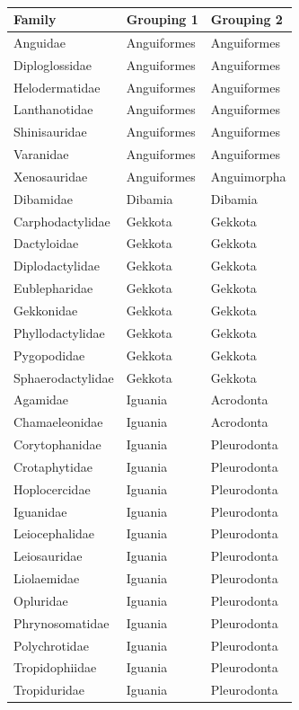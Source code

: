 \documentclass[a4paper, 12pt]{article}
\begin{document}
\begin{longtable}{lll}
\caption{} 

\hline
\textbf{Family} & \textbf{Grouping 1} & \textbf{Grouping 2}\\ 
\hline
Anguidae & Anguiformes & Anguiformes \\
Diploglossidae & Anguiformes & Anguiformes \\
Helodermatidae & Anguiformes & Anguiformes \\
Lanthanotidae & Anguiformes & Anguiformes \\
Shinisauridae & Anguiformes & Anguiformes \\
Varanidae & Anguiformes & Anguiformes \\
Xenosauridae & Anguiformes & Anguimorpha \\
Dibamidae & Dibamia & Dibamia \\
Carphodactylidae & Gekkota & Gekkota \\
Dactyloidae & Gekkota & Gekkota \\
Diplodactylidae & Gekkota & Gekkota \\
Eublepharidae & Gekkota & Gekkota \\
Gekkonidae & Gekkota & Gekkota \\
Phyllodactylidae & Gekkota & Gekkota \\
Pygopodidae & Gekkota & Gekkota \\
Sphaerodactylidae & Gekkota & Gekkota \\
Agamidae & Iguania & Acrodonta \\
Chamaeleonidae & Iguania & Acrodonta \\
Corytophanidae & Iguania & Pleurodonta \\
Crotaphytidae & Iguania & Pleurodonta \\
Hoplocercidae & Iguania & Pleurodonta \\
Iguanidae & Iguania & Pleurodonta \\
Leiocephalidae & Iguania & Pleurodonta \\
Leiosauridae & Iguania & Pleurodonta \\
Liolaemidae & Iguania & Pleurodonta \\
Opluridae & Iguania & Pleurodonta \\
Phrynosomatidae & Iguania & Pleurodonta \\
Polychrotidae & Iguania & Pleurodonta \\
Tropidophiidae & Iguania & Pleurodonta \\
Tropiduridae & Iguania & Pleurodonta \\

\end{longtable}
\end{document}
